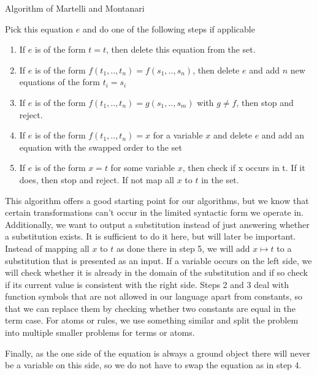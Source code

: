 \begin{algorithm}
    \caption{Algorithm of Martelli and Montanari}
\begin{algorithmic}
    \State Pick this equation $e$ and do one of the following steps if applicable
    \begin{enumerate}
        \item If $e$ is of the form $t = t$, then delete this equation from the set.
        \item If $e$ is of the form $f(t_1, .., t_n) = f(s_1,.., s_n)$, then delete $e$ and add $n$ new equations of the form $t_i = s_i$
        \item If $e$ is of the form $f(t_1, .., t_n) = g(s_1,.., s_m)$ with $g \neq f$, then stop and reject.
        \item If $e$ is of the form $f(t_1,..,t_n) = x$ for a variable $x$ and delete $e$ and add an equation with the swapped order to the set
        \item If $e$ is of the form $x=t$ for some variable $x$, then check if x occurs in t. If it does, then stop and reject. If not map all $x$ to $t$ in the set.
    \end{enumerate}
    \EndWhile
\end{algorithmic}
\end{algorithm}

This algorithm offers a good starting point for our algorithms, but we know that certain transformations can't occur in the limited syntactic form we operate in. Additionally, we want to output a substitution instead of just answering whether a substitution exists. It is sufficient to do it here, but will later be important. Instead of mapping all $x$ to $t$ as done there in step 5, we will add $x\mapsto t$ to a substitution that is presented as an input. If a variable occurs on the left side, we will check whether it is already in the domain of the substitution and if so check if its current value is consistent with the right side.
Steps 2 and 3 deal with function symbols that are not allowed in our language apart from constants, so that we can replace them by checking whether two constants are equal in the term case. For atoms or rules, we use something similar and split the problem into multiple smaller problems for terms or atoms.

Finally, as the one side of the equation is always a ground object there will never be a variable on this side, so we do not have to swap the equation as in step 4.

